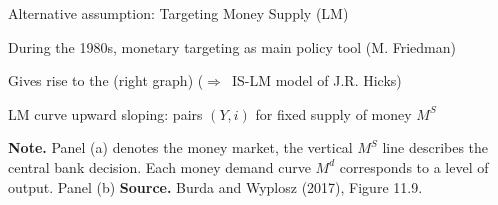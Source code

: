 \documentclass{beamer}
\newcommand{\tb}[1]{{\color{blue}{\textbf{#1}}}}
\newenvironment{mytemize}
{\vfill\itemize[nolistsep,itemsep=\fill,label=\color{blue}{$\triangleright$}]}
  {\enditemize}
\newcommand{\rarr}{$\Rightarrow$\ }
\begin{document}
\begin{frame}{Alternative assumption: Targeting Money Supply (LM)}
\begin{mytemize}
  \item During the 1980s, monetary targeting as main policy tool (M. Friedman)
\item Gives rise to the \tb{LM curve} (right graph) (\rarr IS-LM model  of J.R. Hicks)
\item %
  LM curve  upward sloping: pairs $(Y, i)$ for fixed supply of money $M^S$%
\end{mytemize}
\begin{center}
\begin{figure}[h!]
\end{figure}
\begin{minipage}{1.0\columnwidth}
\tiny	
\textbf{Note.} Panel (a) denotes the money market, the vertical $M^S$ line describes the central bank decision. Each money demand curve $M^d$ corresponds to a level of output. Panel (b) 
\textbf{Source.} Burda and Wyplosz (2017), Figure 11.9.\\
\end{minipage}
\end{center}
\end{frame}
\end{document}
